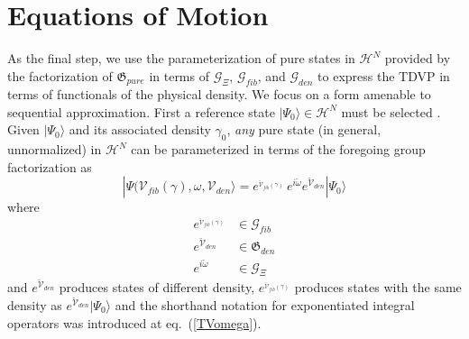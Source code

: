\documentclass[aps,preprint]{revtex4}%
\begin{document}
\section{Equations of Motion}

As the final step, we use the parameterization of pure states in
$\mathcal{H}^{N}$ provided by the factorization of $\mathfrak{G}_{pure}$ in
terms of $\mathcal{G}_{\Xi}$, $\mathcal{G}_{fib}$, and $\mathcal{G}_{den}$ to
express the TDVP in terms of functionals of the physical density. We focus on
a form amenable to sequential approximation. First a reference state
$|\Psi_{0}\rangle\in\mathcal{H}^{N}$ must be selected \cite{RefState}. Given
$|\Psi_{0}\rangle$ and its associated density $\gamma_{0}$, \emph{any} pure
state (in general, unnormalized) in $\mathcal{H}^{N}$ can be parameterized in
terms of the foregoing group factorization as
\begin{equation}
|\Psi(\mathcal{V}_{fib}(\gamma),\omega,\mathcal{V}_{den}\rangle
=e^{_{\mathcal{\breve{V}}_{fib}(\gamma)}}\,e^{i\breve{\omega}}e^{\breve
{\mathcal{V}}_{den}}|\Psi_{0}\rangle\label{vv1omega1}%
\end{equation}
where
\begin{align}
e^{_{\mathcal{\breve{V}}_{fib}(\gamma)}}  &  \in\mathcal{G}_{fib}\nonumber\\
e^{\breve{\mathcal{V}}_{den}}  &  \in\mathfrak{G}_{den}\nonumber\\
e^{i\breve{\omega}}  &  \in\mathcal{G}_{\Xi} \label{vv1omega2}%
\end{align}
and $e^{\breve{\mathcal{V}}_{den}}$ produces states of different density,
$e^{_{\mathcal{\breve{V}}_{fib}(\gamma)}}$ produces states with the same
density as $e^{\breve{\mathcal{V}}_{den}}|\Psi_{0}\rangle$ and the shorthand
notation for exponentiated integral operators was introduced at
eq.~(\ref{TVomega}).
\end{document}
